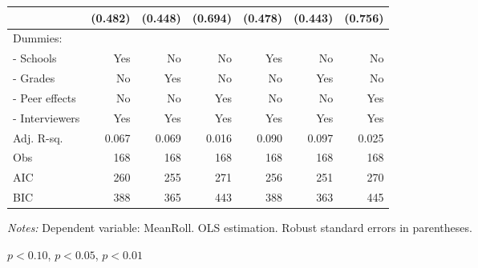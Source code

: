 \begin{table}[htbp]
\begin{adjustbox}{width=1\textwidth}
\begin{threeparttable}
\begin{tabular}{l*{6}{D{.}{.}{-1}}}
                    &             (0.482)   &             (0.448)   &             (0.694)   &             (0.478)   &             (0.443)   &             (0.756)   \\ \midrule
Dummies: &&&&& \\                    
- Schools             &                 Yes   &                  No   &                  No   &                 Yes   &                  No   &                  No   \\
- Grades              &                  No   &                 Yes   &                  No   &                  No   &                 Yes   &                  No   \\
- Peer effects        &                  No   &                  No   &                 Yes   &                  No   &                  No   &                 Yes   \\
- Interviewers        &                 Yes   &                 Yes   &                 Yes   &                 Yes   &                 Yes   &                 Yes   \\
\midrule
Adj. R-sq.          &               0.067   &               0.069   &               0.016   &               0.090   &               0.097   &               0.025   \\
Obs                 &                 168   &                 168   &                 168   &                 168   &                 168   &                 168   \\
AIC                 &                 260   &                 255   &                 271   &                 256   &                 251   &                 270   \\
BIC                 &                 388   &                 365   &                 443   &                 388   &                 363   &                 445   \\
\bottomrule
\end{tabular}

\begin{tablenotes}
\footnotesize
\item \textit{Notes:} Dependent variable: MeanRoll. OLS estimation. Robust standard errors in parentheses. \\
\item \sym{*} \(p<0.10\), \sym{**} \(p<0.05\), \sym{***} \(p<0.01\)
\end{tablenotes}
\end{threeparttable}
\end{adjustbox}
\label{tab:cheat_math}
\end{table}